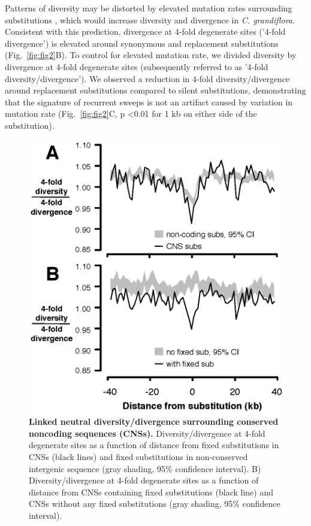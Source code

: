 Patterns of diversity may be distorted by elevated mutation rates surrounding substitutions \citep{Sattath2011-ns}, which would increase diversity and divergence in \textit{C. grandiflora}. Consistent with this prediction, divergence at 4-fold degenerate sites ('4-fold divergence') is elevated around synonymous and replacement substitutions (Fig.~\ref{fig:fig2}B). To control for elevated mutation rate, we divided diversity by divergence at 4-fold degenerate sites (subsequently referred to as '4-fold diversity/divergence'). We observed a reduction in 4-fold diversity/divergence around replacement substitutions compared to silent substitutions, demonstrating that the signature of recurrent sweeps is not an artifact caused by variation in mutation rate (Fig.~\ref{fig:fig2}C, p \textless  0.01 for 1 kb on either side of the substitution).

\begin{figure}[ht!]
      \centering
       \includegraphics{Ch2Fig3}
    \caption{\textbf{Linked neutral diversity/divergence surrounding conserved noncoding sequences (CNSs).} Diversity/divergence at 4-fold degenerate sites as a function of distance from fixed substitutions in CNSs (black lines) and fixed substitutions in non-conserved intergenic sequence (gray shading, 95\% confidence interval).
B) Diversity/divergence at 4-fold degenerate sites as a function of distance from CNSs containing fixed substitutions (black line) and CNSs without any fixed substitutions (gray shading, 95\% confidence interval).}
    \label{fig:fig3}
\end{figure}

